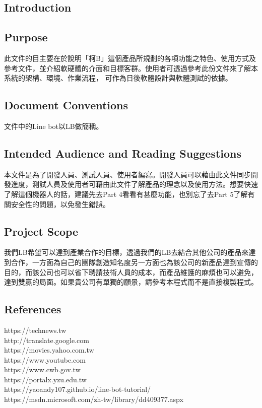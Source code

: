 \documentclass{scrreprt}
\begin{document}
\begin{CJK}{UTF8}{bkai}
\chapter{Introduction}

\section{Purpose}
此文件的目主要在於說明「柯B」這個產品所規劃的各項功能之特色、使用方式及參考文件，並介紹軟硬體的介面和目標客群。使用者可透過參考此份文件來了解本系統的架構、環境、作業流程， 可作為日後軟體設計與軟體測試的依據。

\section{Document Conventions}
文件中的Line bot以LB做簡稱。

\section{Intended Audience and Reading Suggestions}
本文件是為了開發人員、測試人員、使用者編寫。開發人員可以藉由此文件同步開發進度，測試人員及使用者可藉由此文件了解產品的理念以及使用方法。想要快速了解這個機器人的話，建議先去Part 4看看有甚麼功能，也別忘了去Part 5了解有關安全性的問題，以免發生錯誤。

\section{Project Scope}
我們LB希望可以達到產業合作的目標，透過我們的LB去結合其他公司的產品來達到合作，一方面為自己的團隊創造知名度另一方面也為該公司的新產品達到宣傳的目的，而該公司也可以省下聘請技術人員的成本，而產品維護的麻煩也可以避免，達到雙贏的局面。如果貴公司有單獨的願景，請參考本程式而不是直接複製程式。

\section{References}
{\color{blue}https://technews.tw}\\
{\color{blue}http://translate.google.com}\\
{\color{blue}https://movies.yahoo.com.tw}\\
{\color{blue}https://www.youtube.com}\\
{\color{blue}https://www.cwb.gov.tw}\\
{\color{blue}https://portalx.yzu.edu.tw}\\
{\color{blue}https://yaoandy107.github.io/line-bot-tutorial/}\\
{\color{blue}https://msdn.microsoft.com/zh-tw/library/dd409377.aspx}\\



\end{CJK}
\end{document}

